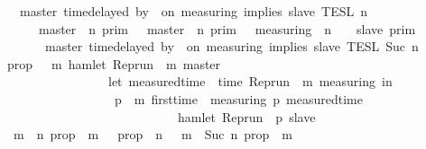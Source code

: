 \begin{isabellebody}
\ \ {\isacartoucheopen}{\isasymlbrakk}\ master\ time{\isacharminus}delayed\ by\ {\isasymdelta}{\isasymtau}\ on\ measuring\ implies\ slave\ {\isasymrbrakk}\isactrlsub T\isactrlsub E\isactrlsub S\isactrlsub L\isactrlbsup {\isasymge}\ n\isactrlesup \ {\isacharequal}\isanewline
\ \ \ \ \ {\isacharparenleft}{\isasymlbrakk}\ master\ {\isasymnot}{\isasymUp}\ n\ {\isasymrbrakk}\isactrlsub p\isactrlsub r\isactrlsub i\isactrlsub m\ {\isasymunion}\ {\isacharparenleft}{\isasymlbrakk}\ master\ {\isasymUp}\ n\ {\isasymrbrakk}\isactrlsub p\isactrlsub r\isactrlsub i\isactrlsub m\ {\isasyminter}\ {\isasymlbrakk}\ measuring\ {\isacharat}\ n\ {\isasymoplus}\ {\isasymdelta}{\isasymtau}\ {\isasymRightarrow}\ slave\ {\isasymrbrakk}\isactrlsub p\isactrlsub r\isactrlsub i\isactrlsub m{\isacharparenright}{\isacharparenright}\isanewline
\ \ \ \ \ {\isasyminter}\ {\isasymlbrakk}\ master\ time{\isacharminus}delayed\ by\ {\isasymdelta}{\isasymtau}\ on\ measuring\ implies\ slave\ {\isasymrbrakk}\isactrlsub T\isactrlsub E\isactrlsub S\isactrlsub L\isactrlbsup {\isasymge}\ Suc\ n\isactrlesup {\isacartoucheclose}\isanewline
%
\isadelimproof
%
\endisadelimproof
%
\isatagproof
{}\isamarkupfalse%
\ {\isacharminus}\isanewline
\ \ \isamarkupfalse%
\ {\isacharquery}prop\ {\isacharequal}\ {\isacartoucheopen}{\isasymlambda}{\isasymrho}\ m{\isachardot}\ hamlet\ {\isacharparenleft}{\isacharparenleft}Rep{\isacharunderscore}run\ {\isasymrho}{\isacharparenright}\ m\ master{\isacharparenright}\ {\isasymlongrightarrow}\isanewline
\ \ \ \ \ \ \ \ \ \ \ \ \ \ \ \ \ {\isacharparenleft}let\ measured{\isacharunderscore}time\ {\isacharequal}\ time\ {\isacharparenleft}{\isacharparenleft}Rep{\isacharunderscore}run\ {\isasymrho}{\isacharparenright}\ m\ measuring{\isacharparenright}\ in\isanewline
\ \ \ \ \ \ \ \ \ \ \ \ \ \ \ \ \ \ {\isasymforall}p\ {\isasymge}\ m{\isachardot}\ first{\isacharunderscore}time\ {\isasymrho}\ measuring\ p\ {\isacharparenleft}measured{\isacharunderscore}time\ {\isacharplus}\ {\isasymdelta}{\isasymtau}{\isacharparenright}\isanewline
\ \ \ \ \ \ \ \ \ \ \ \ \ \ \ \ \ \ \ \ \ \ \ \ \ \ \ {\isasymlongrightarrow}\ hamlet\ {\isacharparenleft}{\isacharparenleft}Rep{\isacharunderscore}run\ {\isasymrho}{\isacharparenright}\ p\ slave{\isacharparenright}{\isacharparenright}{\isacartoucheclose}\isanewline
\ \ \isamarkupfalse%
\ {\isacartoucheopen}{\isacharbraceleft}{\isasymrho}{\isachardot}\ {\isasymforall}m\ {\isasymge}\ n{\isachardot}\ {\isacharquery}prop\ {\isasymrho}\ m{\isacharbraceright}\ {\isacharequal}\ {\isacharbraceleft}{\isasymrho}{\isachardot}\ {\isacharquery}prop\ {\isasymrho}\ n{\isacharbraceright}\ {\isasyminter}\ {\isacharbraceleft}{\isasymrho}{\isachardot}\ {\isasymforall}m\ {\isasymge}\ Suc\ n{\isachardot}\ {\isacharquery}prop\ {\isasymrho}\ m{\isacharbraceright}{\isacartoucheclose}\isanewline

\end{isabellebody}
